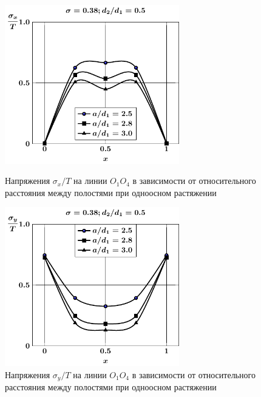 \begin{figure}[h!]
\centering\footnotesize
\parbox[b]{7.5cm}{\centering\includegraphics[width=7.6cm]{cav4-oblate-a-d50-t1-sig_x.pdf}
\caption{Напряжения $\sigma_x/T$ на линии $O_1O_4$ в зависимости от относительного расстояния между полостями при одноосном растяжении
\label{f:10:2}}}\hfil\hfil
\parbox[b]{7.5cm}{\centering\includegraphics[width=7.6cm]{cav4-oblate-a-d50-t1-sig_y.pdf}
\caption{Напряжения $\sigma_y/T$ на линии $O_1O_4$ в зависимости от относительного расстояния между полостями при одноосном растяжении
\label{f:10:3}}}
\end{figure}

